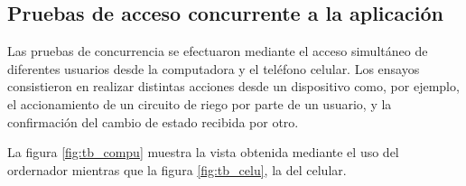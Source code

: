 \subsection{Pruebas de acceso concurrente a la aplicación}
\label{sec:Pruebas de acceso concurrente a la aplicación}



Las pruebas de concurrencia se efectuaron mediante el acceso simultáneo de diferentes usuarios desde la computadora y el teléfono celular. Los ensayos consistieron en realizar distintas acciones desde un dispositivo como, por ejemplo, el accionamiento de un circuito de riego por parte de un usuario, y la confirmación del cambio de estado recibida por otro. 
 
La figura \ref{fig:tb_compu} muestra la vista obtenida mediante el uso del ordernador mientras que la figura  \ref{fig:tb_celu}, la del celular.

